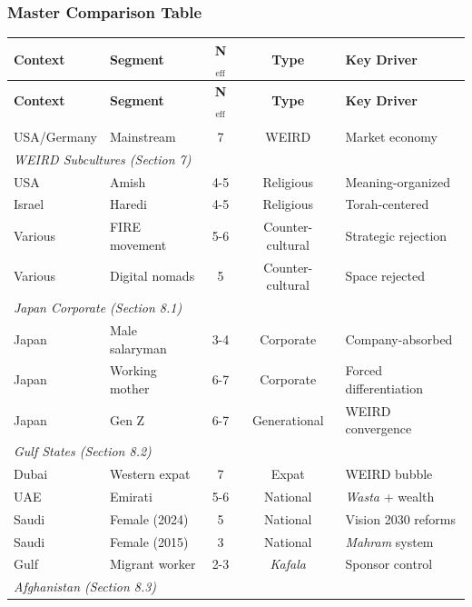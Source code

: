 \subsubsection{Master Comparison Table}

\begin{center}
\scriptsize
\begin{longtable}{@{}llccp{4cm}@{}}
\toprule
\textbf{Context} & \textbf{Segment} & \textbf{N$_{\text{eff}}$} & \textbf{Type} & \textbf{Key Driver} \\
\midrule
\endfirsthead
\toprule
\textbf{Context} & \textbf{Segment} & \textbf{N$_{\text{eff}}$} & \textbf{Type} & \textbf{Key Driver} \\
\midrule
\endhead
\bottomrule
\endlastfoot
\multicolumn{5}{l}{\textit{WEIRD Baseline}} \\
USA/Germany & Mainstream & 7 & WEIRD & Market economy \\
\midrule
\multicolumn{5}{l}{\textit{WEIRD Subcultures (Section 7)}} \\
USA & Amish & 4-5 & Religious & Meaning-organized \\
Israel & Haredi & 4-5 & Religious & Torah-centered \\
Various & FIRE movement & 5-6 & Counter-cultural & Strategic rejection \\
Various & Digital nomads & 5 & Counter-cultural & Space rejected \\
\midrule
\multicolumn{5}{l}{\textit{Japan Corporate (Section 8.1)}} \\
Japan & Male salaryman & 3-4 & Corporate & Company-absorbed \\
Japan & Working mother & 6-7 & Corporate & Forced differentiation \\
Japan & Gen Z & 6-7 & Generational & WEIRD convergence \\
\midrule
\multicolumn{5}{l}{\textit{Gulf States (Section 8.2)}} \\
Dubai & Western expat & 7 & Expat & WEIRD bubble \\
UAE & Emirati & 5-6 & National & \textit{Wasta} + wealth \\
Saudi & Female (2024) & 5 & National & Vision 2030 reforms \\
Saudi & Female (2015) & 3 & National & \textit{Mahram} system \\
Gulf & Migrant worker & 2-3 & \textit{Kafala} & Sponsor control \\
\midrule
\multicolumn{5}{l}{\textit{Afghanistan (Section 8.3)}} \\

\end{longtable}
\end{center}
